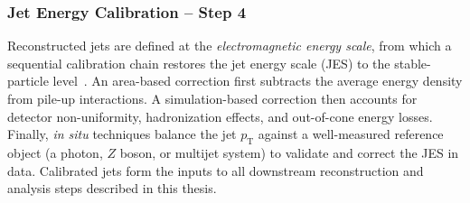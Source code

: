\subsubsection{Jet Energy Calibration -- Step 4}

Reconstructed jets are defined at the \textit{electromagnetic energy scale}, from which a sequential calibration chain restores the jet energy scale (JES) to the stable-particle level~\cite{ATLASJESCalib}. 
An area-based correction first subtracts the average energy density from pile-up interactions. 
A simulation-based correction then accounts for detector non-uniformity, hadronization effects, and out-of-cone energy losses. 
Finally, \textit{in situ} techniques balance the jet $p_{\mathrm{T}}$ against a well-measured reference object (a photon, $Z$ boson, or multijet system) to validate and correct the JES in data. 
Calibrated jets form the inputs to all downstream reconstruction and analysis steps described in this thesis.